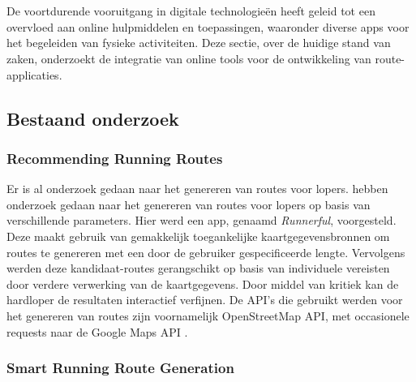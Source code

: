 \chapter{}%
\label{ch:stand-van-zaken}



De voortdurende vooruitgang in digitale technologieën heeft geleid tot een overvloed aan online hulpmiddelen en toepassingen,
waaronder diverse apps voor het begeleiden van fysieke activiteiten.
Deze sectie, over de huidige stand van zaken, onderzoekt de integratie van online tools voor de ontwikkeling van route-applicaties.

\section{Bestaand onderzoek}

    \subsection{Recommending Running Routes}

    Er is al onderzoek gedaan naar het genereren van routes voor lopers.
    \textcite{Loepp2018} hebben onderzoek gedaan naar het genereren van routes voor lopers op basis van verschillende parameters.
    Hier werd een app, genaamd \emph{Runnerful}, voorgesteld.
    Deze maakt gebruik van gemakkelijk toegankelijke kaartgegevensbronnen om routes te genereren met een door de gebruiker gespecificeerde lengte.
    Vervolgens werden  deze kandidaat-routes gerangschikt op basis van individuele vereisten door verdere verwerking van de kaartgegevens.
    Door middel van kritiek kan de hardloper de resultaten interactief verfijnen.
    De API's die gebruikt werden voor het genereren van routes zijn voornamelijk OpenStreetMap API,
    met occasionele requests naar de Google Maps API \autocite{Loepp2018}.

    \subsection{Smart Running Route Generation}

